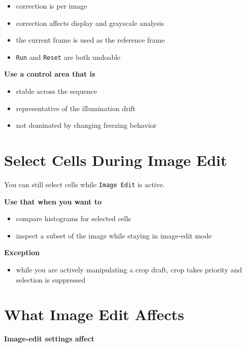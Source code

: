 \documentclass[
  9pt,
  letterpaper,
  oneside,
  open=any,
  DIV=15,
  parskip=half-,
  headings=big,
  numbers=noenddot
]{scrbook}
\newcommand{\manuallead}[1]{%
  \vspace{0.15em}%
  {\sffamily\bfseries\color{ManualBlue}#1}\par\nobreak\vspace{0.05em}%
}
\begin{document}
\begin{itemize}[leftmargin=*,itemsep=0.35em,topsep=0.4em]
\item correction is per image
\item correction affects display and grayscale analysis
\item the current frame is used as the reference frame
\item \texttt{Run} and \texttt{Reset} are both undoable
\end{itemize}

\manuallead{Use a control area that is}

\begin{itemize}[leftmargin=*,itemsep=0.35em,topsep=0.4em]
\item stable across the sequence
\item representative of the illumination drift
\item not dominated by changing freezing behavior
\end{itemize}

\section{Select Cells During Image Edit}

You can still select cells while \texttt{Image Edit} is active.


\manuallead{Use that when you want to}

\begin{itemize}[leftmargin=*,itemsep=0.35em,topsep=0.4em]
\item compare histograms for selected cells
\item inspect a subset of the image while staying in image-edit mode
\end{itemize}

\manuallead{Exception}

\begin{itemize}[leftmargin=*,itemsep=0.35em,topsep=0.4em]
\item while you are actively manipulating a crop draft, crop takes priority and selection is suppressed
\end{itemize}

\section{What Image Edit Affects}

\manuallead{Image-edit settings affect}
\end{document}

